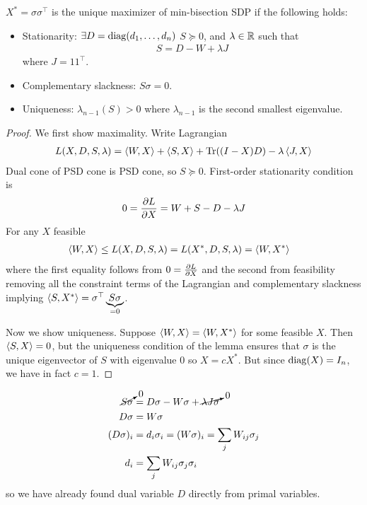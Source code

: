 \begin{lemma}\label{lem:kkt-plus-uniq}
  $X^* = \sigma \sigma^\top$ is the unique maximizer of min-bisection
  SDP if the following holds:
  \begin{itemize}
    \item Stationarity: $\exists D = \operatorname{diag}(d_1, \ldots, d_n)$
      $S \succeq 0$, and $\lambda \in \mathbb{R}$ such that
      \begin{align}
        S = D - W + \lambda J
      \end{align}
      where $J = 1 1^\top$.
    \item Complementary slackness: $S \sigma = 0$.
    \item Uniqueness: $\lambda_{n-1}(S) > 0$ where
      $\lambda_{n-1}$ is the second smallest eigenvalue.
  \end{itemize}
\end{lemma}

\begin{proof}
  We first show maximality. Write Lagrangian
  \begin{align}
    L(X, D, S, \lambda)
    &= \braket{W, X} + \braket{S, X}
    + \operatorname{Tr} ((I - X)D) - \lambda \braket{J, X} \\
  \end{align}
  Dual cone of PSD cone is PSD cone, so $S \succeq 0$. First-order
  stationarity condition is
  \begin{align}
    0 
    = \frac{\partial L}{\partial X}
    = W + S - D - \lambda J
  \end{align}
  For any $X$ feasible
  \begin{align}
    \braket{W, X}
    &\leq L(X, D, S, \lambda)
    = L(X^*, D, S, \lambda)
    = \braket{W, X^*}
  \end{align}
  where the first equality follows from $0 = \frac{\partial L}{\partial X}$
  and the second from feasibility removing all the constraint terms
  of the Lagrangian and
  complementary slackness implying
  $\braket{S, X^*} = \sigma^\top \underbrace{S \sigma}_{=0}$.

  Now we show uniqueness. Suppose $\braket{W, X} = \braket{W, X^*}$
  for some feasible $X$. Then $\braket{S, X} = 0$,
  but the uniqueness condition of the lemma ensures that $\sigma$
  is the unique eigenvector of $S$ with eigenvalue $0$ so
  $X = c X^*$.
  But since $\operatorname{diag}(X) = I_n$, we have in fact $c = 1$.
\end{proof}

\begin{align}
  \cancelto{0}{S \sigma}
  &= D \sigma - W \sigma + \cancelto{0}{\lambda J \sigma} \\
  D \sigma &= W \sigma \\
  (D \sigma)_i &= d_i \sigma_i = (W \sigma)_i = \sum_j W_{ij} \sigma_j \\
  d_i &= \sum_j W_{ij} \sigma_j \sigma_i
\end{align}
so we have already found dual variable $D$ directly from primal variables.

